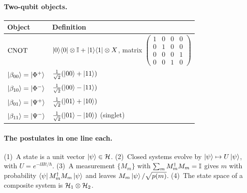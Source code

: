\paragraph{Two-qubit objects.}
\begin{center}
\small
\begin{tabular}{@{}ll@{}}
  \toprule
  Object & Definition\\
  \midrule
  $\mathrm{CNOT}$ & $\left|0\right\rangle\!\left\langle0\right|\otimes\mathbb{I}+\left|1\right\rangle\!\left\langle1\right|\otimes X$, matrix $\begin{pmatrix}1&0&0&0\\0&1&0&0\\0&0&0&1\\0&0&1&0\end{pmatrix}$\\[10pt]
  $\left|\beta_{00}\right\rangle=\left|\Phi^+\right\rangle$ & $\frac1{\sqrt2}(\left|00\right\rangle+\left|11\right\rangle)$\\
  $\left|\beta_{10}\right\rangle=\left|\Phi^-\right\rangle$ & $\frac1{\sqrt2}(\left|00\right\rangle-\left|11\right\rangle)$\\
  $\left|\beta_{01}\right\rangle=\left|\Psi^+\right\rangle$ & $\frac1{\sqrt2}(\left|01\right\rangle+\left|10\right\rangle)$\\
  $\left|\beta_{11}\right\rangle=\left|\Psi^-\right\rangle$ & $\frac1{\sqrt2}(\left|01\right\rangle-\left|10\right\rangle)$ (singlet)\\
  \bottomrule
\end{tabular}
\end{center}

\paragraph{The postulates in one line each.}
(1)~A state is a unit vector $\left|\psi\right\rangle\in\mathcal{H}$.
(2)~Closed systems evolve by $\left|\psi\right\rangle\mapsto U\left|\psi\right\rangle$, with $U=e^{-\ii Ht/\hbar}$.
(3)~A measurement $\{M_m\}$ with $\sum_mM_m^\dagger M_m=\mathbb{I}$ gives $m$ with probability $\left\langle\psi\right| M_m^\dagger M_m\left|\psi\right\rangle$ and leaves $M_m\left|\psi\right\rangle/\sqrt{p(m)}$.
(4)~The state space of a composite system is $\mathcal{H}_1\otimes\mathcal{H}_2$.
